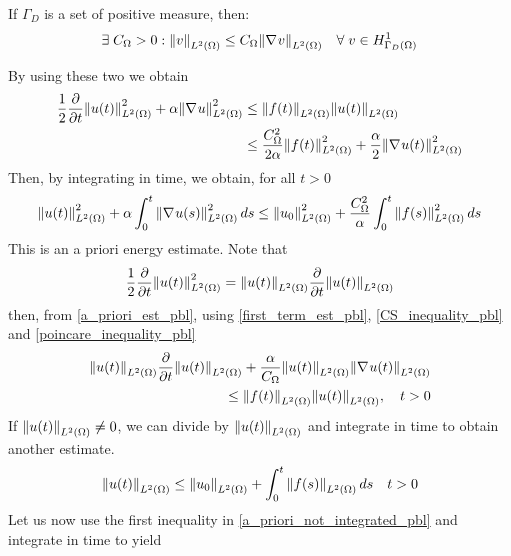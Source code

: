 \begin{definition}
    If \(\Gamma_D\) is a set of positive measure, then:
    \begin{equation}
        \exists \; C_{\Omega} > 0 : \norm{v}_{L^2(\Omega)} \leq C_\Omega \norm{\nabla\mspace{1mu} v}_{L^2(\Omega)} \quad \forall \; v \in H^1_{\Gamma_D(\Omega)} \label{poincare_inequality_pbl}
    \end{equation}
\end{definition}
By using these two we obtain 
\begin{equation}
    \begin{aligned}
        \frac{1}{2} \partialderivative{\null}{t} \ltwonorm{u(t)}^2 + \alpha \ltwonorm{\grad u}^2 &\leq \ltwonorm{f(t)}\ltwonorm{u(t)} \\
        & \leq \frac{C_\Omega^2}{2\alpha} \ltwonorm{f(t)}^2 + \frac{\alpha}{2} \ltwonorm{\grad u(t)}^2
        \label{a_priori_not_integrated_pbl}
    \end{aligned}
\end{equation}
Then, by integrating in time, we obtain, for all \(t > 0\)
\begin{equation}
    \norm{u(t)}_{L^2(\Omega)}^2 +\alpha \int_0^t \norm{\nabla\mspace{1mu} u(s)}_{L^2(\Omega)}^2 \, ds \leq \norm{u_0}_{L^2(\Omega)}^2 + \frac{C_\Omega^2}{\alpha} \int_0^t \norm{f(s)}_{L^2(\Omega)}^2 \, ds
    \label{energy_estimate_pbl}
\end{equation}
This is an a priori energy estimate. Note that 
\[
    \frac{1}{2} \partialderivative{\null}{t} \ltwonorm{u(t)}^2 = \ltwonorm{u(t)} \partialderivative{\null}{t} \ltwonorm{u(t)} 
\]
then, from \eqref{a_priori_est_pbl}, using \eqref{first_term_est_pbl}, \eqref{CS_inequality_pbl} and \eqref{poincare_inequality_pbl}
\begin{equation}
    \begin{split}
        \ltwonorm{u(t)} \partialderivative{\null}{t} \ltwonorm{u(t)} + \frac{\alpha}{C_\Omega} \ltwonorm{u(t)} \ltwonorm{\grad u(t)} \\
        \leq  \ltwonorm{f(t)}\ltwonorm{u(t)}, \quad t>0
    \end{split}
\end{equation}
If \(\norm{u(t)}_{L^2(\Omega)} \neq 0\), we can divide by \(\norm{u(t)}_{L^2(\Omega)}\) and integrate in time to obtain another estimate.
\begin{equation}
    \norm{u(t)}_{L^2(\Omega)} \leq \norm{u_0}_{L^2(\Omega)} + \int_0^t \norm{f(s)}_{L^2(\Omega)} \, ds \quad t >0
    \label{another_a_priori_pbl}
\end{equation}
Let us now use the first inequality in \eqref{a_priori_not_integrated_pbl} and integrate in time to yield 
